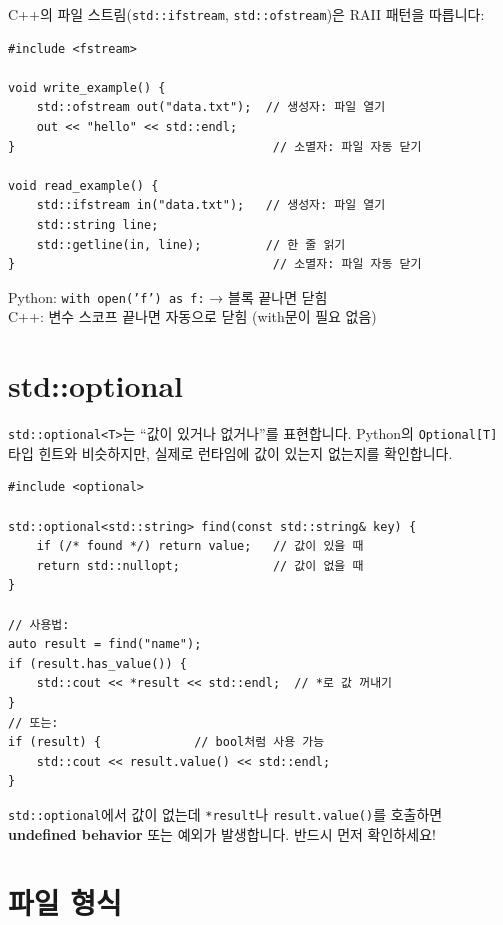 \documentclass[11pt,a4paper]{book}
\newcommand{\code}[1]{\texttt{#1}}
\begin{document}
C++의 파일 스트림(\code{std::ifstream}, \code{std::ofstream})은 RAII 패턴을 따릅니다:

\begin{lstlisting}[style=cpp]
#include <fstream>

void write_example() {
    std::ofstream out("data.txt");  // 생성자: 파일 열기
    out << "hello" << std::endl;
}                                    // 소멸자: 파일 자동 닫기

void read_example() {
    std::ifstream in("data.txt");   // 생성자: 파일 열기
    std::string line;
    std::getline(in, line);         // 한 줄 읽기
}                                    // 소멸자: 파일 자동 닫기
\end{lstlisting}

\begin{pythonbox}
Python: \code{with open('f') as f:} → 블록 끝나면 닫힘\\
C++: 변수 스코프 끝나면 자동으로 닫힘 (with문이 필요 없음)
\end{pythonbox}

\section{std::optional}

\code{std::optional<T>}는 ``값이 있거나 없거나''를 표현합니다. Python의 \code{Optional[T]} 타입 힌트와 비슷하지만, 실제로 런타임에 값이 있는지 없는지를 확인합니다.

\begin{lstlisting}[style=cpp]
#include <optional>

std::optional<std::string> find(const std::string& key) {
    if (/* found */) return value;   // 값이 있을 때
    return std::nullopt;             // 값이 없을 때
}

// 사용법:
auto result = find("name");
if (result.has_value()) {
    std::cout << *result << std::endl;  // *로 값 꺼내기
}
// 또는:
if (result) {             // bool처럼 사용 가능
    std::cout << result.value() << std::endl;
}
\end{lstlisting}

\begin{warningbox}
\code{std::optional}에서 값이 없는데 \code{*result}나 \code{result.value()}를 호출하면 \textbf{undefined behavior} 또는 예외가 발생합니다. 반드시 먼저 확인하세요!
\end{warningbox}

\section{파일 형식}
\end{document}
